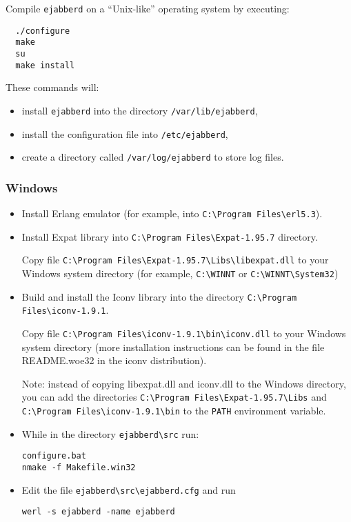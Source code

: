 \documentclass[a4paper,10pt]{article}
\newcommand{\ind}[1]{\begin{latexonly}\index{#1}\end{latexonly}}
\newcommand{\ejabberd}{\texttt{ejabberd}}
\begin{document}
Compile \ejabberd{} on a ``Unix-like'' operating system by executing:

\begin{verbatim}
  ./configure
  make
  su
  make install
\end{verbatim}

These commands will:
\begin{itemize}
\item install \ejabberd{} into the directory \verb|/var/lib/ejabberd|,
\item install the configuration file into \verb|/etc/ejabberd|,
\item create a directory called \verb|/var/log/ejabberd| to store log files.
\end{itemize}

\subsubsection{Windows}
\label{sec:compilationwin}
\ind{compilation!on Windows}

\begin{itemize}
\item Install Erlang emulator (for example, into \verb|C:\Program Files\erl5.3|).
\item Install Expat library into \verb|C:\Program Files\Expat-1.95.7|
  directory.

  Copy file \verb|C:\Program Files\Expat-1.95.7\Libs\libexpat.dll|
  to your Windows system directory (for example, \verb|C:\WINNT| or
  \verb|C:\WINNT\System32|)
\item Build and install the Iconv library into the directory
  \verb|C:\Program Files\iconv-1.9.1|.

  Copy file \verb|C:\Program Files\iconv-1.9.1\bin\iconv.dll| to your
  Windows system directory (more installation instructions can be found in the
  file README.woe32 in the iconv distribution).

  Note: instead of copying libexpat.dll and iconv.dll to the Windows
  directory, you can add the directories
  \verb|C:\Program Files\Expat-1.95.7\Libs| and
  \verb|C:\Program Files\iconv-1.9.1\bin| to the \verb|PATH| environment
  variable.
\item While in the directory \verb|ejabberd\src| run:
\begin{verbatim}
configure.bat
nmake -f Makefile.win32
\end{verbatim}
\item Edit the file \verb|ejabberd\src\ejabberd.cfg| and run
\begin{verbatim}
werl -s ejabberd -name ejabberd
\end{verbatim}
\end{itemize}
\end{document}
